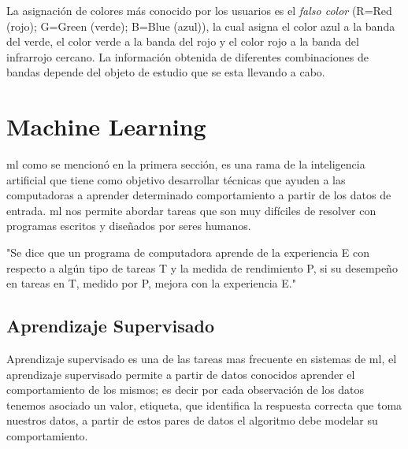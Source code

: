La asignación de colores más conocido por los usuarios es el \textit{falso color} (R=Red (rojo); G=Green (verde); B=Blue (azul)), la cual asigna el color azul a la banda del verde, el color verde a la banda del rojo y el color rojo a la banda del infrarrojo cercano. La información obtenida de diferentes combinaciones de bandas depende del objeto de estudio que se esta llevando a cabo.






\section{Machine Learning}\label{sec:machinelaerning}

\ac{ml} como se mencionó en la primera sección, es una rama de la inteligencia artificial que tiene como objetivo desarrollar técnicas que ayuden a las computadoras a aprender determinado comportamiento a partir de los datos de entrada. \ac{ml} nos permite abordar tareas que son muy difíciles de resolver con programas escritos y diseñados por seres humanos.

"Se dice que un programa de computadora aprende de la experiencia E con respecto a algún tipo de tareas T y la medida de rendimiento P, si su desempeño en tareas en T, medido por P, mejora con la experiencia E." \citep{Mitchell}

\subsection{Aprendizaje Supervisado}\label{sub:aprendizaje_supervisado}

Aprendizaje supervisado es una de las tareas mas frecuente en sistemas de \ac{ml}, el aprendizaje supervisado permite a partir de datos conocidos aprender el comportamiento de los mismos; es decir por cada observación de los datos tenemos asociado un valor, etiqueta, que identifica la respuesta correcta que toma nuestros datos, a partir de estos pares de datos el algoritmo debe modelar su comportamiento. 

